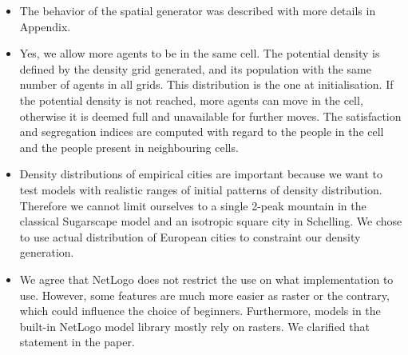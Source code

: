 \documentclass[11pt,a4paper,sans]{moderncv}        %
\begin{document}
\begin{itemize}
	
	\item The behavior of the spatial generator was described with more details in Appendix.
	
	\item Yes, we allow more agents to be in the same cell. The potential density is defined by the density grid generated, and its population with the same number of agents in all grids. This distribution is the one at initialisation. If the potential density is not reached, more agents can move in the cell, otherwise it is deemed full and unavailable for further moves. The satisfaction and segregation indices are computed with regard to the people in the cell and the people present in neighbouring cells.
	
	\item Density distributions of empirical cities are important because we want to test models with realistic ranges of initial patterns of density distribution. Therefore we cannot limit ourselves to a single 2-peak mountain in the classical Sugarscape model and an isotropic square city in Schelling. We chose to use actual distribution of European cities to constraint our density generation.
		
	
	\item We agree that NetLogo does not restrict the use on what implementation to use. However, some features are much more easier as raster or the contrary, which could influence the choice of beginners. Furthermore, models in the built-in NetLogo model library mostly rely on rasters. We clarified that statement in the paper.
	

\end{itemize}
\end{document}
